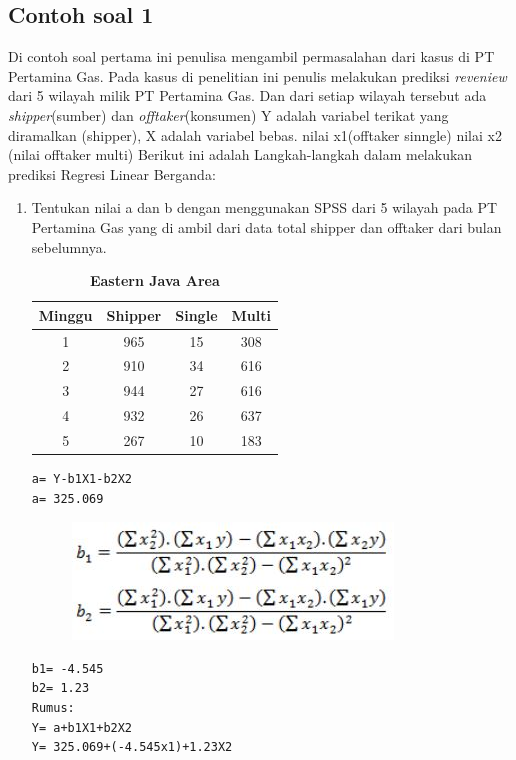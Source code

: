 \subsection{Contoh soal 1}
\par Di contoh soal pertama ini penulisa mengambil permasalahan dari kasus di PT Pertamina Gas. Pada kasus di penelitian ini penulis melakukan prediksi \textit{reveniew} dari 5 wilayah milik PT Pertamina Gas. Dan dari setiap wilayah tersebut ada \textit{shipper}(sumber) dan \textit{offtaker}(konsumen)
	Y adalah variabel terikat yang diramalkan (shipper), X adalah variabel bebas. nilai x1(offtaker sinngle) nilai x2 (nilai offtaker multi)\citep{hijriani2017implementasi}
Berikut ini adalah Langkah-langkah dalam melakukan prediksi Regresi Linear Berganda:\citep{analisisrls}
\begin{enumerate}
        \item 	Tentukan nilai a dan b dengan menggunakan SPSS dari 5 wilayah pada PT Pertamina Gas yang di ambil dari data total shipper dan offtaker dari bulan sebelumnya.
\begin{table}[!ht]
\centering
\caption{\textbf{Eastern Java Area}}
\begin{tabular}{|c|c|c|c|}
\hline
Minggu & Shipper & Single & Multi \\ \hline
1      & 965     & 15     & 308   \\ \hline
2      & 910     & 34     & 616   \\ \hline
3      & 944     & 27     & 616   \\ \hline
4      & 932     & 26     & 637   \\ \hline
5      & 267     & 10     & 183   \\ \hline
\end{tabular}
\end{table}
\begin{lstlisting}
a= Y-b1X1-b2X2      
a= 325.069
\end{lstlisting}
\begin{figure}[!ht]
\includegraphics[scale=0.6]{figures/b1b2.JPG}
\label{Figure4}
\end{figure}
\begin{lstlisting}
b1= -4.545
b2= 1.23
Rumus:
Y= a+b1X1+b2X2
Y= 325.069+(-4.545x1)+1.23X2
\end{lstlisting}


\end{enumerate}
